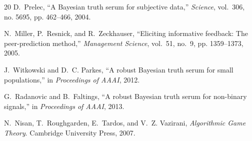 \documentclass[conference]{IEEEtran}
\begin{document}
\begin{thebibliography}{20}
D.~Prelec,
``A Bayesian truth serum for subjective data,''
\emph{Science}, vol.~306, no. 5695, pp. 462--466, 2004.

N.~Miller, P.~Resnick, and R.~Zeckhauser,
``Eliciting informative feedback: The peer-prediction method,''
\emph{Management Science}, vol.~51, no.~9, pp. 1359--1373, 2005.

J.~Witkowski and D.~C. Parkes,
``A robust Bayesian truth serum for small populations,''
in \emph{Proceedings of AAAI}, 2012.

G.~Radanovic and B.~Faltings,
``A robust Bayesian truth serum for non-binary signals,''
in \emph{Proceedings of AAAI}, 2013.

N.~Nisan, T.~Roughgarden, E.~Tardos, and V.~Z. Vazirani,
\emph{Algorithmic Game Theory}.
Cambridge University Press, 2007.

\end{thebibliography}
\end{document}
